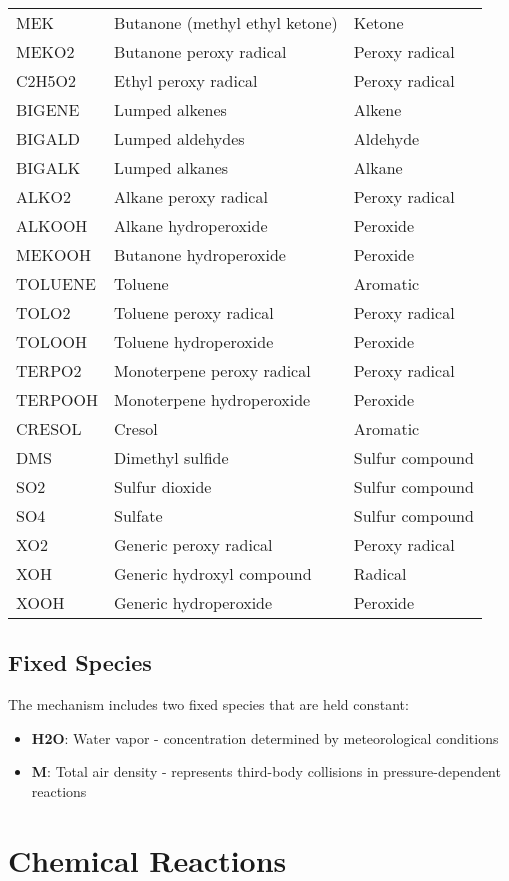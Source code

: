 \documentclass[12pt,a4paper]{article}
\begin{document}
\begin{longtable}{|p{3cm}|p{8cm}|p{3cm}|}
MEK & Butanone (methyl ethyl ketone) & Ketone \\
MEKO2 & Butanone peroxy radical & Peroxy radical \\
C2H5O2 & Ethyl peroxy radical & Peroxy radical \\
BIGENE & Lumped alkenes & Alkene \\
BIGALD & Lumped aldehydes & Aldehyde \\
BIGALK & Lumped alkanes & Alkane \\
ALKO2 & Alkane peroxy radical & Peroxy radical \\
ALKOOH & Alkane hydroperoxide & Peroxide \\
MEKOOH & Butanone hydroperoxide & Peroxide \\
TOLUENE & Toluene & Aromatic \\
TOLO2 & Toluene peroxy radical & Peroxy radical \\
TOLOOH & Toluene hydroperoxide & Peroxide \\
TERPO2 & Monoterpene peroxy radical & Peroxy radical \\
TERPOOH & Monoterpene hydroperoxide & Peroxide \\
CRESOL & Cresol & Aromatic \\
DMS & Dimethyl sulfide & Sulfur compound \\
SO2 & Sulfur dioxide & Sulfur compound \\
SO4 & Sulfate & Sulfur compound \\
XO2 & Generic peroxy radical & Peroxy radical \\
XOH & Generic hydroxyl compound & Radical \\
XOOH & Generic hydroperoxide & Peroxide \\
\hline
\end{longtable}

\subsection{Fixed Species}

The mechanism includes two fixed species that are held constant:
\begin{itemize}
    \item \textbf{H2O}: Water vapor - concentration determined by meteorological conditions
    \item \textbf{M}: Total air density - represents third-body collisions in pressure-dependent reactions
\end{itemize}

\section{Chemical Reactions}
\end{document}
